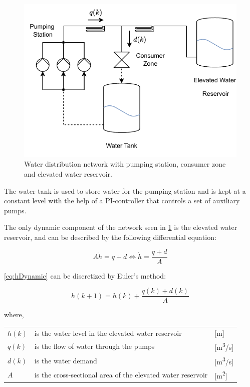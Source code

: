  \begin{figure}[h!]
	\centering
	\includegraphics[width=0.81\linewidth]{Figures/WDN}
	\caption{Water distribution network with pumping station, consumer zone and elevated water reservoir.}
	\label{fig:WDN}
\end{figure}

The water tank is used to store water for the pumping station and is kept at a constant level with the help of a PI-controller that controls a set of auxiliary pumps.

The only dynamic component of the network seen in \cref{fig:WDN} is the elevated water reservoir, and can be described by the following differential equation:

\begin{equation}\label{eq:hDynamic}
	A\dot{h} = q + d \Leftrightarrow \dot{h} = \frac{q+d}{A}
\end{equation}  

\cref{eq:hDynamic} can be discretized by Euler's method:

\begin{equation}
	h(k+1) = h(k) + \frac{q(k)+d(k)}{A} 
\end{equation}

where,
\begin{center}
	\begin{tabular}{l p{10cm} l}
		$ h(k) $ & is the water level in the elevated water reservoir & [\si{m}]\\
		$ q(k) $ & is the flow of water through the pumps & [\si{m\cubed}/\si{s}]\\
		$ d(k) $ & is the water demand & [\si{m\cubed}/\si{s}]\\
		$ A $ & is the cross-sectional area of the elevated water reservoir & [\si{m\squared}]
	\end{tabular}
\end{center}

